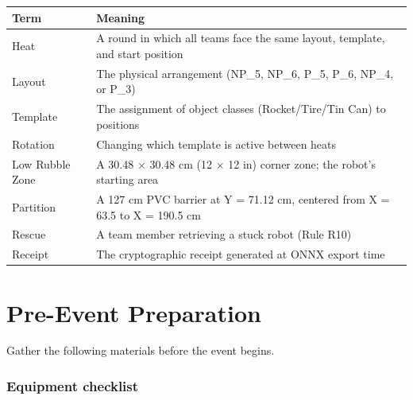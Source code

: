 \documentclass[a4]{article}
\begin{document}
\begin{table}[H]
\centering
\begin{tabular}{ll}
\toprule
\textbf{Term} & \textbf{Meaning} \\
\midrule
Heat & A round in which all teams face the same layout, template, and start position \\
Layout & The physical arrangement (NP\_5, NP\_6, P\_5, P\_6, NP\_4, or P\_3) \\
Template & The assignment of object classes (Rocket/Tire/Tin Can) to positions \\
Rotation & Changing which template is active between heats \\
Low Rubble Zone & A 30.48 $\times$ 30.48 cm (12 $\times$ 12 in) corner zone; the robot's starting area \\
Partition & A 127 cm PVC barrier at Y = 71.12 cm, centered from X = 63.5 to X = 190.5 cm \\
Rescue & A team member retrieving a stuck robot (Rule R10) \\
Receipt & The cryptographic receipt generated at ONNX export time \\
\bottomrule
\end{tabular}
\end{table}

\pagebreak
\section*{Pre-Event Preparation}

Gather the following materials before the event begins.

\subsubsection*{Equipment checklist}
\end{document}
